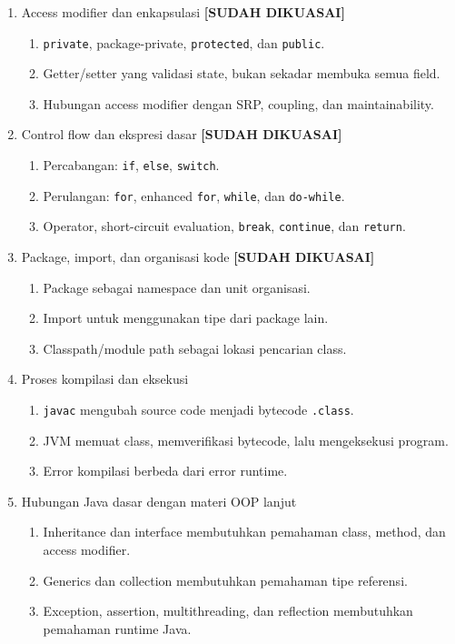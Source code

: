 \begin{enumerate}
    \item Access modifier dan enkapsulasi \textbf{[SUDAH DIKUASAI]}
    \begin{enumerate}
        \item \texttt{private}, package-private, \texttt{protected}, dan \texttt{public}.
        \item Getter/setter yang validasi state, bukan sekadar membuka semua field.
        \item Hubungan access modifier dengan SRP, coupling, dan maintainability.
    \end{enumerate}
    \item Control flow dan ekspresi dasar \textbf{[SUDAH DIKUASAI]}
    \begin{enumerate}
        \item Percabangan: \texttt{if}, \texttt{else}, \texttt{switch}.
        \item Perulangan: \texttt{for}, enhanced \texttt{for}, \texttt{while}, dan \texttt{do-while}.
        \item Operator, short-circuit evaluation, \texttt{break}, \texttt{continue}, dan \texttt{return}.
    \end{enumerate}
    \item Package, import, dan organisasi kode \textbf{[SUDAH DIKUASAI]}
    \begin{enumerate}
        \item Package sebagai namespace dan unit organisasi.
        \item Import untuk menggunakan tipe dari package lain.
        \item Classpath/module path sebagai lokasi pencarian class.
    \end{enumerate}
    \item Proses kompilasi dan eksekusi
    \begin{enumerate}
        \item \texttt{javac} mengubah source code menjadi bytecode \texttt{.class}.
        \item JVM memuat class, memverifikasi bytecode, lalu mengeksekusi program.
        \item Error kompilasi berbeda dari error runtime.
    \end{enumerate}
    \item Hubungan Java dasar dengan materi OOP lanjut
    \begin{enumerate}
        \item Inheritance dan interface membutuhkan pemahaman class, method, dan access modifier.
        \item Generics dan collection membutuhkan pemahaman tipe referensi.
        \item Exception, assertion, multithreading, dan reflection membutuhkan pemahaman runtime Java.
    \end{enumerate}
\end{enumerate}

